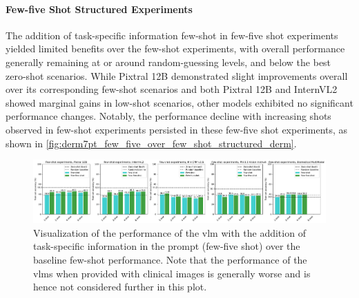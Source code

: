 \documentclass[../ShajiS_RnDReport.tex]{subfiles}
\begin{document}
\paragraph{Few-five Shot Structured Experiments}
The addition of task-specific information few-shot in few-five shot experiments yielded limited benefits over the few-shot experiments, with overall performance generally remaining at or around random-guessing levels, and below the best zero-shot scenarios. While Pixtral 12B demonstrated slight improvements overall over its corresponding few-shot scenarios and both Pixtral 12B and InternVL2 showed marginal gains in low-shot scenarios, other models exhibited no significant performance changes. Notably, the performance decline with increasing shots observed in few-shot experiments persisted in these few-five shot experiments, as shown in \autoref{fig:derm7pt_few_five_over_few_shot_structured_derm}.

\begin{figure}[ht]
    \centering
    \includegraphics[width=\linewidth]{figures/derm7pt_few_five_over_few_shot_structured_derm.pdf}
    \caption{Visualization of the performance of the \gls{vlm} with the addition of task-specific information in the prompt (few-five shot) over the baseline few-shot performance. Note that the performance of the \glspl{vlm} when provided with clinical images is generally worse and is hence not considered further in this plot.}
    \label{fig:derm7pt_few_five_over_few_shot_structured_derm}
\end{figure}
\end{document}
